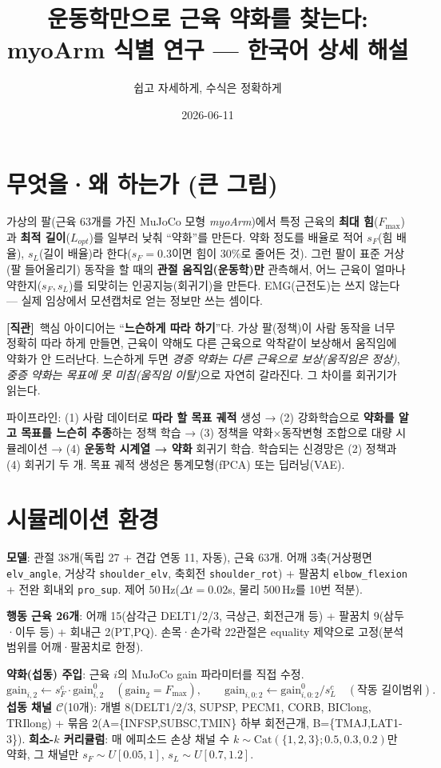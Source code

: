 \documentclass[11pt]{article}
\title{\textbf{운동학만으로 근육 약화를 찾는다:\\ myoArm 식별 연구 --- 한국어 상세 해설}}
\author{쉽고 자세하게, 수식은 정확하게}
\date{2026-06-11}
\newcommand{\Cset}{\mathcal{C}}\newcommand{\Dset}{\mathcal{D}}
\newcommand{\intuition}[1]{\par\smallskip\noindent\textbf{[직관]}\ #1\par\smallskip}
\begin{document}
\maketitle

\section{무엇을·왜 하는가 (큰 그림)}
가상의 팔(근육 63개를 가진 MuJoCo 모형 \emph{myoArm})에서 특정 근육의 \textbf{최대 힘}($F_{\max}$)과 \textbf{최적 길이}($L_{opt}$)를 일부러 낮춰 ``약화''를 만든다. 약화 정도를 배율로 적어 $s_F$(힘 배율), $s_L$(길이 배율)라 한다($s_F{=}0.3$이면 힘이 30\%로 줄어든 것). 그런 팔이 표준 거상(팔 들어올리기) 동작을 할 때의 \textbf{관절 움직임(운동학)만} 관측해서, 어느 근육이 얼마나 약한지($s_F,s_L$)를 되맞히는 인공지능(회귀기)을 만든다. EMG(근전도)는 쓰지 않는다 --- 실제 임상에서 모션캡처로 얻는 정보만 쓰는 셈이다.

\intuition{핵심 아이디어는 ``\textbf{느슨하게 따라 하기}''다. 가상 팔(정책)이 사람 동작을 너무 정확히 따라 하게 만들면, 근육이 약해도 다른 근육으로 악착같이 보상해서 움직임에 약화가 안 드러난다. 느슨하게 두면 \emph{경증 약화는 다른 근육으로 보상(움직임은 정상)}, \emph{중증 약화는 목표에 못 미침(움직임 이탈)}으로 자연히 갈라진다. 그 차이를 회귀기가 읽는다.}

 파이프라인: \;(1) 사람 데이터로 \textbf{따라 할 목표 궤적} 생성 → (2) 강화학습으로 \textbf{약화를 알고 목표를 느슨히 추종}하는 정책 학습 → (3) 정책을 약화$\times$동작변형 조합으로 대량 시뮬레이션 → (4) \textbf{운동학 시계열 → 약화} 회귀기 학습. 학습되는 신경망은 (2) 정책과 (4) 회귀기 두 개. 목표 궤적 생성은 통계모형(fPCA) 또는 딥러닝(VAE).

\section{시뮬레이션 환경}
\textbf{모델}: 관절 38개(독립 27 + 견갑 연동 11, 자동), 근육 63개. 어깨 3축(거상평면 \texttt{elv\_angle}, 거상각 \texttt{shoulder\_elv}, 축회전 \texttt{shoulder\_rot}) + 팔꿈치 \texttt{elbow\_flexion} + 전완 회내외 \texttt{pro\_sup}. 제어 50\,Hz($\Delta t{=}0.02$s, 물리 500\,Hz를 10번 적분).

\textbf{행동 근육 26개}: 어깨 15(삼각근 DELT1/2/3, 극상근, 회전근개 등) + 팔꿈치 9(삼두·이두 등) + 회내근 2(PT,PQ). 손목·손가락 22관절은 equality 제약으로 고정(분석 범위를 어깨·팔꿈치로 한정).

\textbf{약화(섭동) 주입}: 근육 $i$의 MuJoCo gain 파라미터를 직접 수정.
\begin{equation}
\text{gain}_{i,2}\leftarrow s_F^{c}\cdot\text{gain}^{0}_{i,2}\quad(\text{gain}_2=F_{\max}),\qquad
\text{gain}_{i,0:2}\leftarrow \text{gain}^{0}_{i,0:2}/s_L^{c}\quad(\text{작동 길이범위}).
\end{equation}
\textbf{섭동 채널 $\Cset$}(10개): 개별 8(DELT1/2/3, SUPSP, PECM1, CORB, BIClong, TRIlong) + 묶음 2(A=\{INFSP,SUBSC,TMIN\} 하부 회전근개, B=\{TMAJ,LAT1-3\}). \textbf{희소-$k$ 커리큘럼}: 매 에피소드 손상 채널 수 $k\!\sim\!\mathrm{Cat}(\{1,2,3\};0.5,0.3,0.2)$만 약화, 그 채널만 $s_F\!\sim\!U[0.05,1]$, $s_L\!\sim\!U[0.7,1.2]$.
\end{document}
